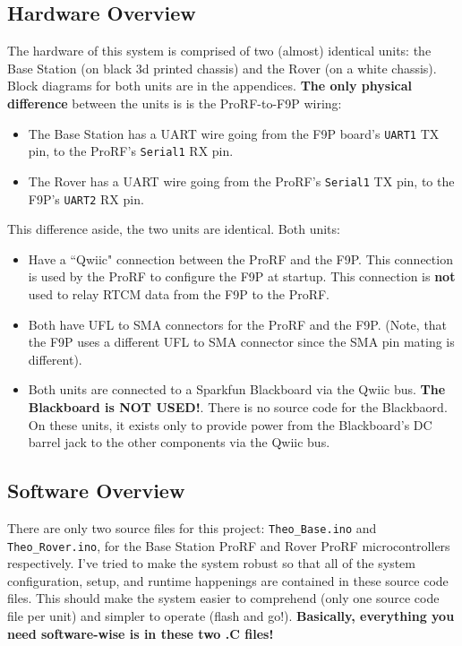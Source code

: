 \documentclass{article}%
\begin{document}
\subsection{Hardware Overview}
The hardware of this system is comprised of two (almost) identical units: the Base Station (on black 3d printed chassis) and the Rover (on a white chassis).  Block diagrams for both units are in the appendices.  \textbf{The only physical difference} between the units is is the ProRF-to-F9P wiring:
	\begin{itemize}
		\item The Base Station has a UART wire going from the F9P board's \texttt{UART1} TX pin, to the ProRF's \texttt{Serial1} RX pin.
		\item The Rover has a UART wire going from the ProRF's \texttt{Serial1} TX pin, to the F9P's \texttt{UART2} RX pin. 
	\end{itemize}
	This difference aside, the two units are identical.  Both units: 
	\begin{itemize}
		\item Have a ``Qwiic" connection between the ProRF and the F9P.  This connection is used by the ProRF to configure the F9P at startup.  This connection is \textbf{not} used to relay RTCM data from the F9P to the ProRF.
		\item Both have UFL to SMA connectors for the ProRF and the F9P. (Note, that the F9P uses a different UFL to SMA connector since the SMA pin mating is different). 
		\item Both units are connected to a Sparkfun Blackboard via the Qwiic bus. \textbf{The Blackboard is NOT USED!}.  There is no source code for the Blackbaord.  On these units, it exists only to provide power from the Blackboard's DC barrel jack to the other components via the Qwiic bus.
	\end{itemize}
\subsection{Software Overview}
There are only two source files for this project: \texttt{Theo\_Base.ino} and \texttt{Theo\_Rover.ino}, for the Base Station ProRF and Rover ProRF microcontrollers respectively. 
I've tried to make the system robust so that all of the system configuration, setup, and runtime happenings are contained in these source code files.  This should make the system easier to comprehend (only one source code file per unit) and simpler to operate (flash and go!).  \textbf{Basically, everything you need software-wise is in these two .C files!}
\end{document}
